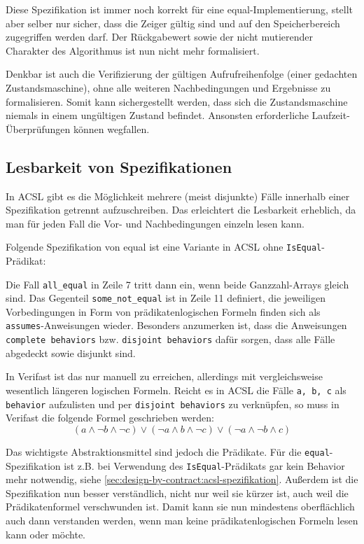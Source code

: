 
 
Diese Spezifikation ist immer noch korrekt für eine equal-Implementierung, stellt aber selber nur sicher,
dass die Zeiger gültig sind und auf den Speicherbereich zugegriffen werden darf. Der Rückgabewert sowie 
der nicht mutierender Charakter des Algorithmus ist nun nicht mehr formalisiert.

Denkbar ist auch die Verifizierung der gültigen Aufrufreihenfolge (einer gedachten Zustandsmaschine),
ohne alle weiteren Nachbedingungen und Ergebnisse zu formalisieren. Somit kann sichergestellt werden,
dass sich die Zustandsmaschine niemals in einem ungültigen Zustand befindet. Ansonsten erforderliche
Laufzeit-Überprüfungen können wegfallen.



\subsection{Lesbarkeit von Spezifikationen}
\label{sec:design-by-contract:behaviors}

In ACSL gibt es die Möglichkeit mehrere (meist disjunkte) Fälle innerhalb einer Spezifikation getrennt
aufzuschreiben. Das erleichtert die Lesbarkeit erheblich, da man für jeden Fall die Vor- und Nachbedingungen
einzeln lesen kann.

Folgende Spezifikation von equal ist eine Variante in ACSL ohne \lstinline{IsEqual}-Prädikat:



Die Fall \lstinline{all_equal} in Zeile 7 tritt dann ein, wenn beide Ganzzahl-Arrays gleich sind. Das Gegenteil
\lstinline{some_not_equal} ist in Zeile 11 definiert, die jeweiligen Vorbedingungen in Form von
prädikatenlogischen Formeln finden sich als \lstinline{assumes}-Anweisungen wieder. Besonders anzumerken ist,
dass die Anweisungen \lstinline{complete behaviors} bzw. \lstinline{disjoint behaviors} dafür sorgen, dass
alle Fälle abgedeckt sowie disjunkt sind.

In Verifast ist das nur manuell zu erreichen, allerdings mit vergleichsweise wesentlich längeren logischen Formeln.
Reicht es in ACSL die Fälle \lstinline{a, b, c} als \lstinline{behavior} aufzulisten und per \lstinline{disjoint behaviors}
zu verknüpfen, so muss in Verifast die folgende Formel geschrieben werden:
\[(a \land \neg b \land \neg c) \lor (\neg a \land b \land \neg c) \lor (\neg a \land \neg b \land c)\]

Das wichtigste Abstraktionsmittel sind jedoch die Prädikate. Für die \lstinline{equal}-Spezifikation ist 
z.B. bei Verwendung des \lstinline{IsEqual}-Prädikats gar kein Behavior mehr notwendig,
siehe \ref{sec:design-by-contract:acsl-spezifikation}. Außerdem ist die Spezifikation nun besser verständlich,
nicht nur weil sie kürzer ist, auch weil die Prädikatenformel verschwunden ist. Damit kann sie nun mindestens
oberflächlich auch dann verstanden werden, wenn man keine prädikatenlogischen Formeln lesen kann oder möchte.
